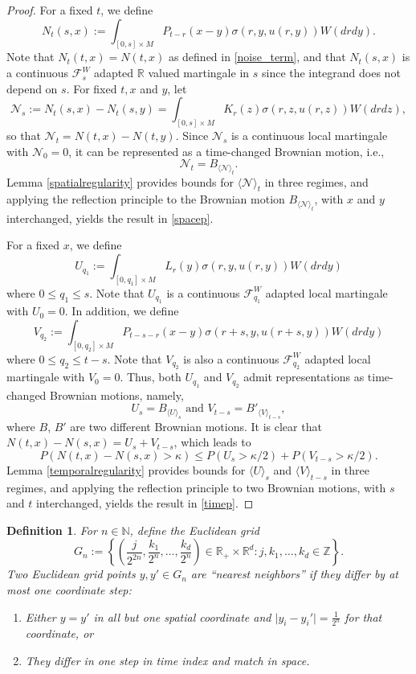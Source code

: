 \documentclass[12pt]{amsart}
\newtheorem{definition}{Definition}[section]
\numberwithin{equation}{section}
\newcommand{\R}{\mathbb{R}}
\newcommand{\Z}{\mathbb{Z}}
\newcommand{\N}{\mathbb{N}}
\newcommand{\1}{\mathbf{1}}
\begin{document}
\begin{proof}
For a fixed $t$, we define
\[N_t(s,x):=\int_{[0,s]\times M} P_{t-r}(x-y)\sigma(r,y,u(r,y))W(drdy).\]
Note that $N_t(t,x)=N(t,x)$ as defined in \eqref{noise_term}, and that $N_t(s,x)$ is a continuous $\mathcal{F}_s^W$ adapted $\R$ valued martingale in $s$ since the integrand does not depend on $s$. For fixed $t,x$ and $y$, let
\[\mathcal{N}_s:=N_t(s,x)-N_t(s,y)=\int_{[0,s]\times M} K_r(z)\sigma(r,z,u(r,z))W(drdz),\]
so that $\mathcal{N}_t=N(t,x)-N(t,y)$. Since $\mathcal{N}_s$ is a continuous local martingale with $\mathcal{N}_0=0$, it can be represented as a time-changed Brownian motion, i.e.,
\[\mathcal{N}_t=B_{\langle \mathcal{N}\rangle_t}.\]
Lemma \ref{spatialregularity} provides bounds for $\langle \mathcal{N}\rangle_t$ in three regimes, and applying the reflection principle to the Brownian motion $B_{\langle \mathcal{N}\rangle_t}$, with $x$ and $y$ interchanged, yields the result in \eqref{spacep}.

For a fixed $x$, we define 
\[U_{q_1}:=\int_{[0,{q_1}]\times M} L_r(y)\sigma(r,y,u(r,y))W(drdy)\]
where $0\leq q_1\leq s$. Note that $U_{q_1}$ is a continuous $\mathcal{F}_{q_1}^W$ adapted local martingale with $U_0=0$. In addition, we define
\[V_{q_2}:=\int_{[0,{q_2}]\times M}P_{t-s-r}(x-y)\sigma(r+s,y,u(r+s,y))W(drdy)\]
where $0\leq q_2\leq t-s$. Note that $V_{q_2}$ is also a continuous $\mathcal{F}_{q_2}^W$ adapted local martingale with $V_0=0$. Thus, both $U_{q_1}$ and $V_{q_2}$ admit representations as time-changed Brownian motions, namely,
\[U_s=B_{\langle U\rangle_s}\text{~and~}V_{t-s}=B'_{\langle V\rangle_{t-s}},\]
where $B$, $B'$ are two different Brownian motions. It is clear that $N(t,x)-N(s,x)=U_s+V_{t-s}$, which leads to
\[P(N(t,x)-N(s,x)>\kappa)\leq P(U_s>\kappa/2)+P(V_{t-s}>\kappa/2).\]
Lemma \ref{temporalregularity} provides bounds for $\langle U\rangle_s$ and $\langle V\rangle_{t-s}$ in three regimes, and applying the reflection principle to two Brownian motions, with $s$ and $t$ interchanged, yields the result in \eqref{timep}.
\end{proof}

\begin{definition}
    \label{definition}
    For $n\in\N$, define the Euclidean grid
\begin{equation*}
    G_{n}:=\left\lbrace\left(\frac{j}{2^{2n}},\frac{k_1}{2^n},\dots,\frac{k_d}{2^n}\right)\in\R_+\times\R^d:j,k_1,\dots,k_d\in\Z\right\rbrace.
\end{equation*}
Two Euclidean grid points $y,y'\in G_{n}$ are “nearest neighbors” if they differ by at most one coordinate step:
\begin{enumerate}
    \item Either $y=y'$ in all but one spatial coordinate and $\vert y_i-y_i'\vert=\frac{1}{2^n}$ for that coordinate, or
    \item They differ in one step in time index and match in space.
\end{enumerate}
\end{definition}
\end{document}
